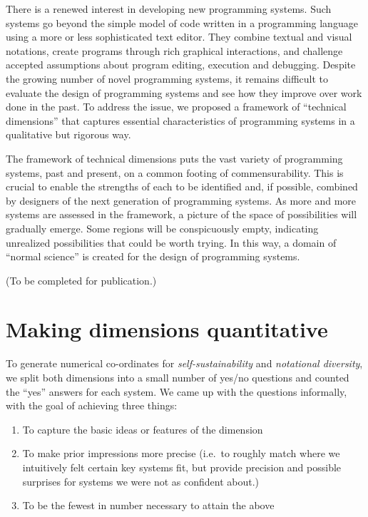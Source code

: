 \documentclass[english,submission]{programming}
\providecommand{\DIFaddbegin}{} %
\providecommand{\DIFaddend}{} %
\begin{document}
There is a renewed interest in developing new programming systems. Such
systems go beyond the simple model of code written in a programming
language using a more or less sophisticated text editor. They combine
textual and visual notations, create programs through rich graphical
interactions, and challenge accepted assumptions about program editing,
execution and debugging. Despite the growing number of novel programming
systems, it remains difficult to evaluate the design of programming
systems and see how they improve over work done in the past. To address
the issue, we proposed a framework of ``technical dimensions'' that
captures essential characteristics of programming systems in a
qualitative but rigorous way.

The framework of technical dimensions puts the vast variety of
programming systems, past and present, on a common footing of
commensurability. This is crucial to enable the strengths of each to be
identified and, if possible, combined by designers of the next
generation of programming systems. As more and more systems are assessed
in the framework, a picture of the space of possibilities will gradually
emerge. Some regions will be conspicuously empty, indicating unrealized
possibilities that could be worth trying. In this way, a domain of
``normal science'' is created for the design of programming systems.

\acks

(To be completed for publication.)

\appendix
\DIFaddbegin 

\DIFaddend \newpage

\hypertarget{making-dimensions-quantitative}{%
\section{Making dimensions
quantitative}\label{making-dimensions-quantitative}}

To generate numerical co-ordinates for \emph{self-sustainability} and
\emph{notational diversity}, we split both dimensions into a small
number of yes/no questions and counted the ``yes'' answers for each
system. We came up with the questions informally, with the goal of
achieving three things:

\begin{enumerate}
\def\labelenumi{\arabic{enumi}.}
\tightlist
\item
  To capture the basic ideas or features of the dimension
\item
  To make prior impressions more precise (i.e.~to roughly match where we
  intuitively felt certain key systems fit, but provide precision and
  possible surprises for systems we were not as confident about.)
\item
  To be the fewest in number necessary to attain the above
\end{enumerate}
\end{document}
